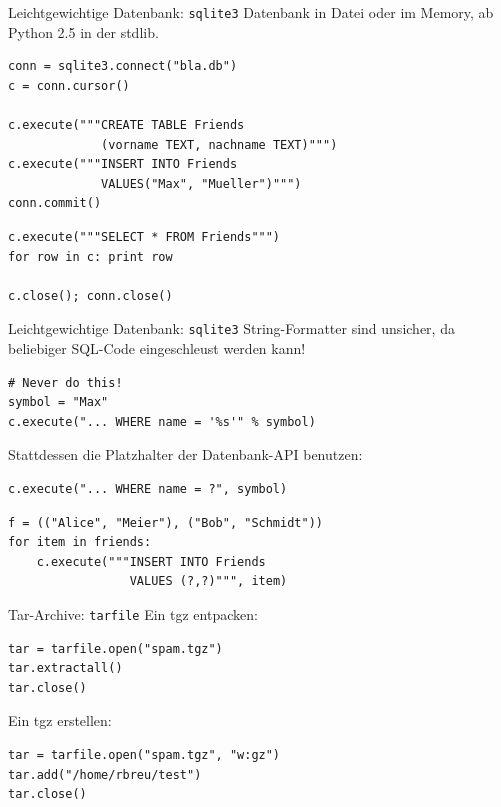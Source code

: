 \begin{frame}[fragile]{Leichtgewichtige Datenbank: \texttt{sqlite3}}
Datenbank in Datei oder im Memory, ab Python 2.5 in der stdlib.
\begin{lstlisting}[style=Python]
conn = sqlite3.connect("bla.db")
c = conn.cursor()

c.execute("""CREATE TABLE Friends
             (vorname TEXT, nachname TEXT)""")
c.execute("""INSERT INTO Friends
             VALUES("Max", "Mueller")""")
conn.commit()
\end{lstlisting}
\begin{lstlisting}[style=Python]
c.execute("""SELECT * FROM Friends""")
for row in c: print row

c.close(); conn.close()
\end{lstlisting}
\end{frame}

\begin{frame}[fragile]{Leichtgewichtige Datenbank: \texttt{sqlite3}}
String-Formatter sind unsicher, da beliebiger SQL-Code eingeschleust werden kann!
\begin{lstlisting}[style=Python]
# Never do this!
symbol = "Max"
c.execute("... WHERE name = '%s'" % symbol)
\end{lstlisting}
Stattdessen die Platzhalter der Datenbank-API benutzen:
\begin{lstlisting}[style=Python]
c.execute("... WHERE name = ?", symbol)
\end{lstlisting}
\begin{lstlisting}[style=Python]
f = (("Alice", "Meier"), ("Bob", "Schmidt"))
for item in friends:
    c.execute("""INSERT INTO Friends 
                 VALUES (?,?)""", item)
\end{lstlisting}
\end{frame}

\begin{frame}[fragile]{Tar-Archive: \texttt{tarfile}}
Ein tgz entpacken:
\begin{lstlisting}[style=Python]
tar = tarfile.open("spam.tgz")
tar.extractall()
tar.close()
\end{lstlisting}
\vspace*{3mm}
Ein tgz erstellen:
\begin{lstlisting}[style=Python]
tar = tarfile.open("spam.tgz", "w:gz")
tar.add("/home/rbreu/test")
tar.close()
\end{lstlisting}
\end{frame}

